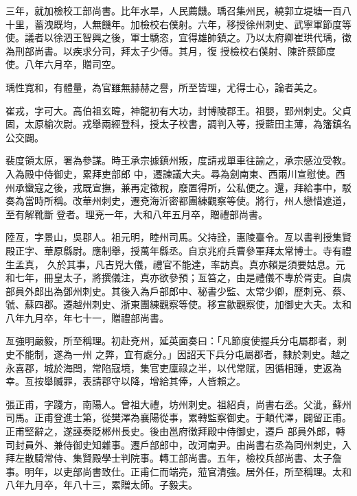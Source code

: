 \begin{pinyinscope}
 三年，就加檢校工部尚書。比年水旱，人民薦饑。瑀召集州民，繞郭立堤塘一百八十里，蓄洩既均，人無饑年。加檢校右僕射。六年，移授徐州刺史、武寧軍節度等使。議者以徐泗王智興之後，軍士驕恣，宜得雄帥鎮之。乃以太府卿崔珙代瑀，徵為刑部尚書。以疾求分司，拜太子少傅。其月，復
 授檢校右僕射、陳許蔡節度使。八年六月卒，贈司空。



 瑀性寬和，有體量，為官雖無赫赫之譽，所至皆理，尤得士心，論者美之。



 崔戎，字可大。高伯祖玄暐，神龍初有大功，封博陵郡王。祖嬰，郢州刺史。父貞固，太原榆次尉。戎舉兩經登科，授太子校書，調判入等，授藍田主薄，為籓鎮名公交闢。



 裴度領太原，署為參謀。時王承宗據鎮州叛，度請戎單車往諭之，承宗感泣受教。入為殿中侍御史，累拜吏部郎
 中，遷諫議大夫。尋為劍南東、西兩川宣慰使。西州承蠻寇之後，戎既宣撫，兼再定徵稅，廢置得所，公私便之。還，拜給事中，駁奏為當時所稱。改華州刺史，遷兗海沂密都團練觀察等使。將行，州人戀惜遮道，至有解靴斷登者。理兗一年，大和八年五月卒，贈禮部尚書。



 陸亙，字景山，吳郡人。祖元明，睦州司馬。父持詮，惠陵臺令。亙以書判授集賢殿正字、華原縣尉。應制舉，授萬年縣丞。自京兆府兵曹參軍拜太常博士。寺有禮生孟真，
 久於其事，凡吉兇大儀，禮官不能達，率訪真。真亦賴是須要姑息。元和七年，冊皇太子，將撰儀注，真亦欲參預；亙笞之，由是禮儀不專於胥吏。自虞部員外郎出為鄧州刺史。其後入為戶部郎中、秘書少監、太常少卿，歷刺兗、蔡、虢、蘇四郡。遷越州刺史、浙東團練觀察等使。移宣歙觀察使，加御史大夫。太和八年九月卒，年七十一，贈禮部尚書。



 亙強明嚴毅，所至稱理。初赴兗州，延英面奏曰：「凡節度使握兵分屯屬郡者，刺史不能制，遂為一州
 之弊，宜有處分。」因詔天下兵分屯屬郡者，隸於刺史。越之永喜郡，城於海閆，常陷寇境，集官吏廩祿之半，以代常賦，因循相踵，吏返為幸。亙按舉贓罪，表請郡守以降，增給其俸，人皆賴之。



 張正甫，字踐方，南陽人。曾祖大禮，坊州刺史。祖紹貞，尚書右丞。父泚，蘇州司馬。正甫登進士第，從樊澤為襄陽從事，累轉監察御史。于頔代澤，闢留正甫。正甫堅辭之，遂誣奏貶郴州長史。後由邕府徵拜殿中侍御史，遷戶
 部員外郎，轉司封員外、兼侍御史知雜事。遷戶部郎中，改河南尹。由尚書右丞為同州刺史，入拜左散騎常侍、集賢殿學士判院事。轉工部尚書。五年，檢校兵部尚書、太子詹事。明年，以吏部尚書致仕。正甫仁而端亮，蒞官清強。居外任，所至稱理。太和八年九月卒，年八十三，累贈太師。子毅夫。




\end{pinyinscope}
